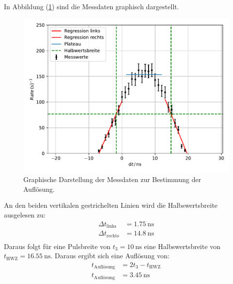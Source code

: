 \FloatBarrier
\noindent In Abbildung (\ref{fig:plateau3}) sind die Messdaten graphisch dargestellt.
\begin{figure}
	\centering
	\includegraphics[scale=0.7]{fig/Plateau3.pdf}
	\caption{Graphische Darstellung der Messdaten zur Bestimmung der Auflösung.}
	\label{fig:plateau3}
\end{figure}
\FloatBarrier
\noindent An den beiden vertikalen gestrichelten Linien wird die Halbswertsbreite ausgelesen zu:
\begin{align*}
	\Delta t_\mathrm{links}&=\SI{1.75}{\nano\second} \\
	\Delta t_\mathrm{rechts}&=\SI{14.8}{\nano\second} \\
\end{align*}
Daraus folgt für eine Pulsbreite von $t_\mathrm{3}=\SI{10}{\nano\second}$ eine Halbswertsbreite von $t_\mathrm{HWZ}=\SI{16.55}{\nano\second}$. Daraus ergibt sich eine Auflösung von:
\begin{align*}
	t_\mathrm{Auflösung}&=2 t_\mathrm{3}-t_\mathrm{HWZ} \\
	t_\mathrm{Auflösung}&=\SI{3.45}{\nano\second}
\end{align*}
